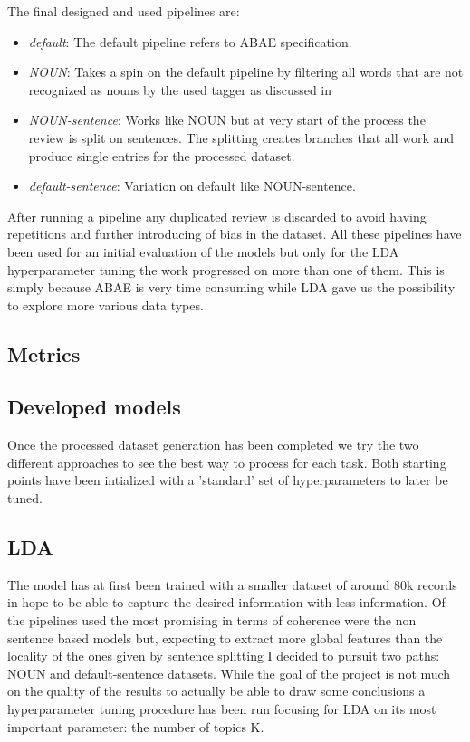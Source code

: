 The final designed and used pipelines are:
\begin{itemize}
    \item {\textit{default}}: The default pipeline refers to ABAE specification.

    \item {\textit{NOUN}}: Takes a spin on the default pipeline by filtering all words that are not recognized as nouns
    by the used tagger as discussed in %

    \item {\textit{NOUN-sentence}}: Works like NOUN but at very start of the process the review is split on sentences.
    The splitting creates branches that all work and produce single entries for the processed dataset.

    \item {\textit{default-sentence}}: Variation on default like NOUN-sentence.
\end{itemize}

After running a pipeline any duplicated review is discarded to avoid having repetitions and further introducing of
bias in the dataset.
All these pipelines have been used for an initial evaluation of the models but only for the LDA hyperparameter
tuning the work progressed on more than one of them. This is simply because ABAE is very time consuming while LDA
gave us the possibility to explore more various data types.

\subsection{Metrics}

\subsection{Developed models}
Once the processed dataset generation has been completed we try the two different approaches to see the best way
to process for each task. Both starting points have been intialized with a 'standard' set of hyperparameters
to later be tuned.

\subsection{LDA}
The model has at first been trained with a smaller dataset of around 80k records in hope to be able to
capture the desired information with less information.
Of the pipelines used the most promising in terms of coherence were the non sentence based models but,
expecting to extract more global features than the locality of the ones given by sentence splitting I
decided to pursuit two paths: NOUN and default-sentence datasets.
While the goal of the project is not much on the quality of the results to actually be able to draw
some conclusions a hyperparameter tuning procedure has been run focusing for LDA on its most important parameter:
the number of topics K.


